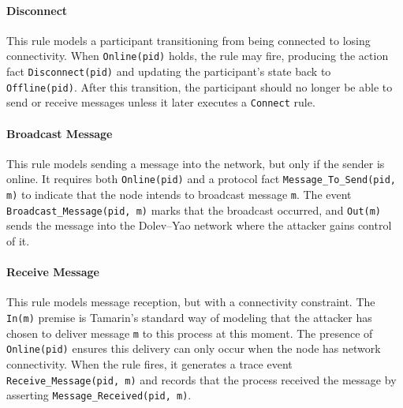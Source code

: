 \documentclass{article}
\begin{document}
\paragraph{Disconnect} This rule models a participant transitioning from being connected to losing 
connectivity. When \texttt{Online(pid)} holds, the rule may fire, producing the action 
fact \texttt{Disconnect(pid)} and updating the participant's state back to 
\texttt{Offline(pid)}. After this transition, the participant should no longer be able 
to send or receive messages unless it later executes a \texttt{Connect} rule.

\begin{minipage}{\linewidth}

\end{minipage}

\paragraph{Broadcast Message} This rule models sending a message into the network, 
but only if the sender is online. It requires both \texttt{Online(pid)} and a protocol 
fact \texttt{Message\_To\_Send(pid, m)} to indicate that the node intends to broadcast 
message \texttt{m}. The event \texttt{Broadcast\_Message(pid, m)} marks that the broadcast 
occurred, and \texttt{Out(m)} sends the message into the Dolev–Yao network where the 
attacker gains control of it.

\begin{minipage}{\linewidth}

\end{minipage}

\paragraph{Receive Message} This rule models message reception, but with a connectivity constraint.  
The \texttt{In(m)} premise is Tamarin’s standard way of modeling that the attacker has 
chosen to deliver message \texttt{m} to this process at this moment. The presence of 
\texttt{Online(pid)} ensures this delivery can only occur when the node has network 
connectivity. When the rule fires, it generates a trace event 
\texttt{Receive\_Message(pid, m)} and records that the process received the message by 
asserting \texttt{Message\_Received(pid, m)}.
\end{document}
